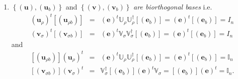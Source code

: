 \documentclass[aps,preprint]{revtex4}
\begin{document}
\begin{enumerate}
\begin{enumerate}
\item $\left\{ \left( \boldsymbol{u}\right) ,\left( \boldsymbol{u}%
_{b}\right) \right\} $ and $\left\{ \left( \boldsymbol{v}\right) ,\left( 
\boldsymbol{v}_{b}\right) \right\} $ \emph{are biorthogonal bases} i.e. 
\begin{eqnarray}
\left( \boldsymbol{u}_{\rho }\right) ^{t}\left[ \left( \boldsymbol{u}_{\rho
b}\right) \right] &=&\left( \boldsymbol{e}\right) ^{t}\mathbb{U}_{\rho }%
\mathbb{U}_{\rho }^{\dagger }\left[ \left( \boldsymbol{e}_{b}\right) \right]
=\left( \boldsymbol{e}\right) ^{t}\left[ \left( \boldsymbol{e}_{b}\right) %
\right] =I_{n} \\
\left( \boldsymbol{v}_{\sigma }\right) ^{t}\left[ \left( \boldsymbol{v}%
_{\sigma b}\right) \right] &=&\left( \boldsymbol{e}\right) ^{t}\mathbb{V}%
_{\sigma }\mathbb{V}_{\sigma }^{\dagger }\left[ \left( \boldsymbol{e}%
_{b}\right) \right] =\left( \boldsymbol{e}\right) ^{t}\left[ \left( 
\boldsymbol{e}_{b}\right) \right] =I_{n}
\end{eqnarray}%
and 
\begin{eqnarray}
\left[ \left( \boldsymbol{u}_{\rho b}\right) \right] \left( \boldsymbol{u}%
_{\rho }\right) ^{t} &=&\left( \boldsymbol{e}\right) ^{t}\mathbb{U}_{\rho }%
\mathbb{U}_{\rho }^{\dagger }\left[ \left( \boldsymbol{e}_{b}\right) \right]
=\left( \boldsymbol{e}\right) ^{t}\left[ \left( \boldsymbol{e}_{b}\right) %
\right] =\mathbb{I}_{n} \\
\left[ \left( \boldsymbol{v}_{\sigma b}\right) \right] \left( \boldsymbol{v}%
_{\sigma }\right) ^{t} &=&\mathbb{V}_{\sigma }^{\dagger }\left[ \left( 
\boldsymbol{e}_{b}\right) \right] \left( \boldsymbol{e}\right) ^{t}\mathbb{V}%
_{\sigma }=\left[ \left( \boldsymbol{e}_{b}\right) \right] \left( 
\boldsymbol{e}\right) ^{t}=\mathbb{I}_{n}.
\end{eqnarray}
\end{enumerate}


\end{enumerate}
\end{document}
